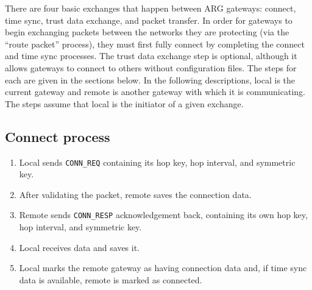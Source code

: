 \par There are four basic exchanges that happen between \ac{ARG} gateways: connect, time sync, trust data exchange, and packet transfer. In order for gateways to begin exchanging packets between the networks they are protecting (via the ``route packet'' process), they must first fully connect by completing the connect and time sync processes. The trust data exchange step is optional, although it allows gateways to connect to others without configuration files. The steps for each are given in the sections below. In the following descriptions, local is the current gateway and remote is another gateway with which it is communicating. The steps assume that local is the initiator of a given exchange.

\subsection{Connect process}
\begin{enumerate}
	\item Local sends \texttt{CONN\_REQ} containing its hop key, hop interval, and symmetric key. 
	\item After validating the packet, remote saves the connection data.
	\item Remote sends \texttt{CONN\_RESP} acknowledgement back, containing its own hop key, hop interval, and symmetric key. 
	\item Local receives data and saves it.
	\item Local marks the remote gateway as having connection data and, if time sync data is available, remote is marked as connected. 
\end{enumerate}

